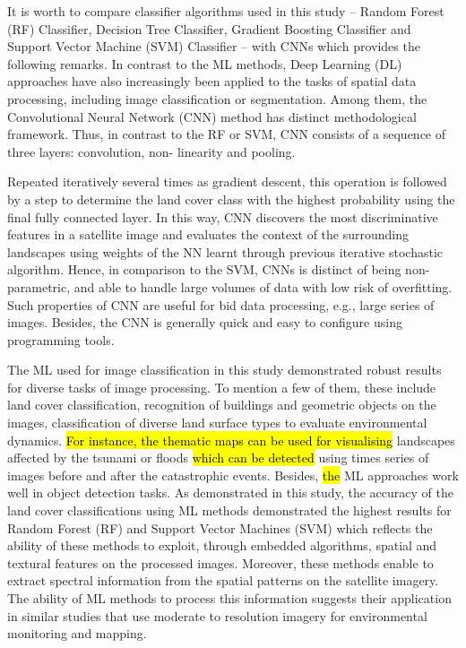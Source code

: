 \documentclass[12pt,a4paper,oneside]{article}
\def \newpar{\vspace{6pt}}
\begin{document}
\newpar It is worth to compare classifier algorithms used in this study -- Random Forest (RF) Classifier, Decision Tree Classifier, Gradient Boosting Classifier and Support Vector Machine (SVM) Classifier -- with CNNs which provides the following remarks. In contrast to the ML methods, Deep Learning (DL) approaches have also increasingly been applied to the tasks of spatial data processing, including image classification or segmentation. Among them, the Convolutional Neural Network (CNN) method has distinct methodological framework. Thus, in contrast to the RF or SVM, CNN consists of a sequence of three layers: convolution, non- linearity and pooling.

\newpar Repeated iteratively several times as gradient descent, this operation is followed by a step to determine the land cover class with the highest probability using the final fully connected layer. In this way, CNN discovers the most discriminative features in a satellite image and evaluates the context of the surrounding landscapes using weights of the NN learnt through previous iterative stochastic algorithm. Hence, in comparison to the SVM, CNNs is distinct of being non-parametric, and able to handle large volumes of data with low risk of overfitting. Such properties of CNN are useful for bid data processing, e.g., large series of images. Besides, the CNN is generally quick and easy to configure using programming tools.

\newpar The ML used for image classification in this study demonstrated robust results for diverse tasks of image processing. To mention a few of them, these include\hl{ }land cover classification, recognition of buildings and geometric objects on the images, classification of diverse land surface types to evaluate environmental dynamics. \hl{For instance, the thematic maps can be used for visualising} landscapes affected by the tsunami or floods \hl{which can be detected }using times series of images before and after the catastrophic events. Besides, \hl{the} ML approaches work well in object detection tasks. As demonstrated in this study, the accuracy of the land cover classifications using ML methods demonstrated the highest results for Random Forest (RF) and Support Vector Machines (SVM) which reflects the ability of these methods to exploit, through embedded algorithms, spatial and textural features on the processed images. Moreover, these methods enable to extract  spectral information from the spatial patterns on the satellite imagery. The ability of ML methods to process this information suggests their application in similar studies that use moderate to  resolution imagery for environmental monitoring and mapping.
 
\end{document}
